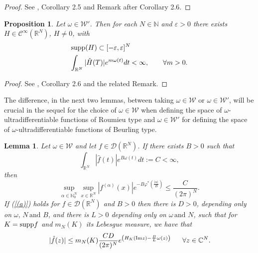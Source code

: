 \documentclass[twoside]{amsart}
\newtheorem{Lemma}[Th]{Lemma}
\newtheorem{Prop}[Th]{Proposition}
\begin{document}
\begin{proof}
  See \cite{BMT}, Corollary 2.5 and Remark after Corollary 2.6.
\end{proof}

\begin{Prop}
  \label{2.6}
  Let $\omega\in{\mathcal{W}}'$. Then for each $N\in\mathbb{N}$ and
$\varepsilon>0$ there exists $H\in\mathcal C^{\infty}(\mathbb{R}^{N})$,
$H\not=0$, with
\begin{align*}
  & {\displaystyle \mbox{\ensuremath{\mathop{\rm supp}\nolimits}}(H)}
  \subset[-\varepsilon,\varepsilon]^{N}\\
  & {\displaystyle \int_{\mathbb{R}^{N}}|\hat{H}(T)|
      e^{m\omega(t)}dt}<\infty,\qquad\forall m>0.
\end{align*}
\end{Prop}

\begin{proof}
See \cite{BMT}, Corollary 2.6 and the related Remark.
\end{proof}

The difference, in the next two lemmas, between taking $\omega\in{\mathcal{W}}$ or 
$\omega\in{\mathcal{W}}'$, will be crucial in the sequel for the choice of
$\omega\in{\mathcal{W}}$ when defining the space of 
$\omega$-ultradifferentiable functions of Roumieu type and $\omega\in{\mathcal{W}}'$
for defining the space of $\omega$-ultradifferentiable functions of
Beurling type.

\begin{Lemma}
\label{3.3A}
Let $\omega\in{\mathcal{W}}$ and let $f\in{\mathcal{D}}(\mathbb{R}^{N})$.
If there exists $B>0$ such that
\[
{\displaystyle \int_{\mathbb{R}^{N}}|\hat{f}(t)|e^{B\omega(t)}dt:=C<\infty},
\]
then 
\begin{equation}
\underset{\alpha\in\mathbb{N}_{0}^{N}}{\sup}
\underset{x\in\mathbb{R}^{N}}{\sup}|f^{(\alpha)}(x)|
e^{-B\varphi^{*}\left(\frac{|\alpha|}{B}\right)}\leq\frac{C}{(2\pi)^{N}}.
\label{(a)}
\end{equation}
If (\ref{(a)}) holds for $f\in{\mathcal{D}}({\mathbb R}^N)$ and $B>0$ then there
is $D>0$, depending only on $\omega,\,N\,\mbox{and}\,\,B$, and there
is $L>0$ depending only on $\omega\,\mbox{and}\,\,N$, such that
for $K={\mathop{\rm supp}\nolimits} f$ and $m_{N}(K)$ its Lebesgue
measure, we have that 
\[
|\hat{f}(z)|\leq m_{N}(K)\frac{CD}{(2\pi)^{N}}
e^{\left(H_{K}({\mathop{\rm Im}\nolimits} z)-\frac{B}{L}\omega(z)\right)}\,\,\,\,\,\,\,\,\,\,
\forall z\in\mathbb{C}^{N}.
\]
\end{Lemma}
\end{document}
